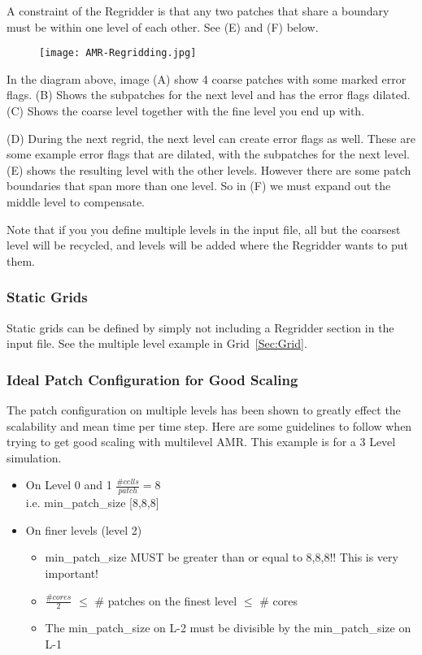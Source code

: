A constraint of the Regridder is that any two patches that share a boundary must be within one level of each other. See (E) and (F) below.


\begin{figure}[H]
  \centering
  \texttt{[image: AMR-Regridding.jpg]}
  \caption{}
  \label{}
\end{figure}

In the diagram above, image (A) show 4 coarse patches with some marked
error flags. (B) Shows the subpatches for the next level and has the
error flags dilated. (C) Shows the coarse level together with the fine
level you end up with.

(D) During the next regrid, the next level can create error flags as
well. These are some example error flags that are dilated, with the
subpatches for the next level. (E) shows the resulting level with the
other levels. However there are some patch boundaries that span more
than one level. So in (F) we must expand out the middle level to
compensate.

Note that if you you define multiple levels in the input file, all but
the coarsest level will be recycled, and levels will be added where
the Regridder wants to put them.

\subsubsection{Static Grids}

Static grids can be defined by simply not including a Regridder
section in the input file. See the multiple level example in
Grid~\ref{Sec:Grid}.

\subsubsection{Ideal Patch Configuration for Good Scaling}
The patch configuration on multiple levels has been shown to greatly
effect the scalability and mean time per time step. 
Here are some guidelines to follow when trying to get good scaling with multilevel AMR.
This example is for a 3 Level simulation.
\begin{itemize}
\item On Level 0 and 1 $\frac{\# cells}{patch} = 8$ \\	
	i.e. min\_patch\_size [8,8,8] 
\item On finer levels (level 2)
\begin{itemize}
	\item min\_patch\_size MUST be greater than or equal to 8,8,8!! This is very important!
	\item $\frac{\# cores}{2} $ $\leq$ $\#$ patches on the finest level $\leq$ $\#$ cores
	\item The min\_patch\_size on L-2 must be divisible by the min\_patch\_size on L-1
\end{itemize}
\end{itemize}

